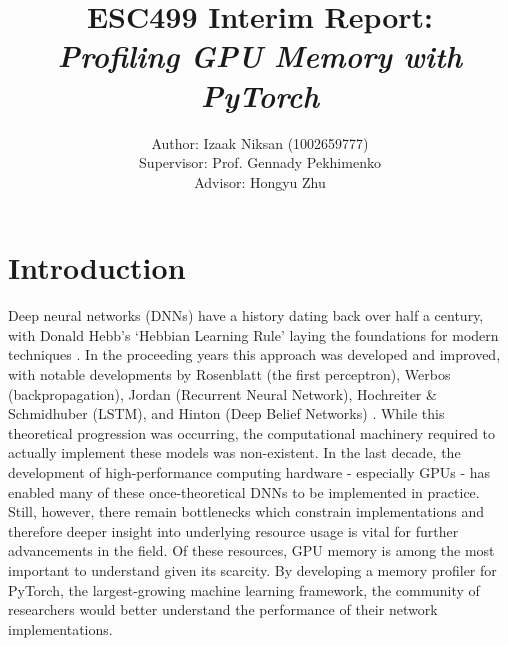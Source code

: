 \documentclass[12pt,letterpaper]{article}
\begin{document}
\title{\textbf{ESC499 Interim Report:\\ \textit{Profiling GPU Memory with PyTorch}}}

\author{Author: Izaak Niksan (1002659777)\\
Supervisor: Prof. Gennady Pekhimenko\\
Advisor: Hongyu Zhu
}

\maketitle
\thispagestyle{empty}
\newpage
\tableofcontents
\newpage

\listoffigures
\newpage 

\section{Introduction}
Deep neural networks (DNNs) have a history dating back over half a century, with Donald Hebb's \enquote*{Hebbian Learning Rule} laying the foundations for modern techniques \cite{dnn_history}. In the proceeding years this approach was developed and improved, with notable developments by Rosenblatt (the first perceptron), Werbos (backpropagation), Jordan (Recurrent Neural Network), Hochreiter \& Schmidhuber (LSTM), and Hinton (Deep Belief Networks) \cite{dnn_history}. While this theoretical progression was occurring, the computational machinery required to actually implement these models was non-existent. In the last decade, the development of high-performance computing hardware - especially GPUs - has enabled many of these once-theoretical DNNs to be implemented in practice. Still, however, there remain bottlenecks which constrain implementations and therefore deeper insight into underlying resource usage is vital for further advancements in the field. Of these resources, GPU memory is among the most important to understand given its scarcity. By developing a memory profiler for PyTorch, the largest-growing machine learning framework, the community of researchers would better understand the performance of their network implementations.
\par 
\end{document}
